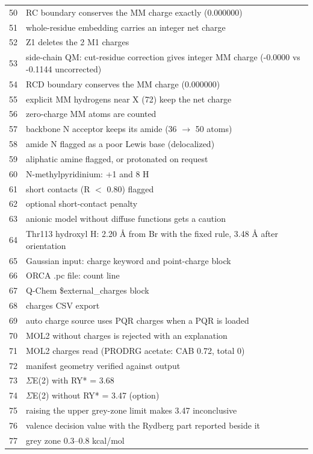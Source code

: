 {\begin{longtable}{rp{14.5cm}}
50 & RC boundary conserves the MM charge exactly (0.000000)\\
51 & whole-residue embedding carries an integer net charge\\
52 & Z1 deletes the 2 M1 charges\\
53 & side-chain QM: cut-residue correction gives integer MM charge (-0.0000 vs -0.1144 uncorrected)\\
54 & RCD boundary conserves the MM charge (0.000000)\\
55 & explicit MM hydrogens near X (72) keep the net charge\\
56 & zero-charge MM atoms are counted\\
57 & backbone N acceptor keeps its amide (36 $\to$ 50 atoms)\\
58 & amide N flagged as a poor Lewis base (delocalized)\\
59 & aliphatic amine flagged, or protonated on request\\
60 & N-methylpyridinium: +1 and 8 H\\
61 & short contacts (R $<$ 0.80) flagged\\
62 & optional short-contact penalty\\
63 & anionic model without diffuse functions gets a caution\\
64 & Thr113 hydroxyl H: 2.20 \AA{} from Br with the fixed rule, 3.48 \AA{} after orientation\\
65 & Gaussian input: charge keyword and point-charge block\\
66 & ORCA .pc file: count line\\
67 & Q-Chem \$external\_charges block\\
68 & charges CSV export\\
69 & auto charge source uses PQR charges when a PQR is loaded\\
70 & MOL2 without charges is rejected with an explanation\\
71 & MOL2 charges read (PRODRG acetate: CAB 0.72, total 0)\\
72 & manifest geometry verified against output\\
73 & $\Sigma$E(2) with RY* = 3.68\\
74 & $\Sigma$E(2) without RY* = 3.47 (option)\\
75 & raising the upper grey-zone limit makes 3.47 inconclusive\\
76 & valence decision value with the Rydberg part reported beside it\\
77 & grey zone 0.3--0.8 kcal/mol\\

\end{longtable}}
